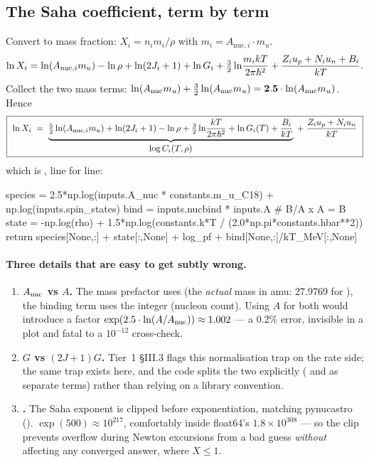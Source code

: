 \subsection{The Saha coefficient, term by term}
\label{sec:saha}

Convert to mass fraction: $X_i = n_i m_i/\rho$ with
$m_i = A_{\mathrm{nuc},i}\cdot m_u$.
%
\begin{equation}
\ln X_i = \ln(A_{\mathrm{nuc},i} m_u) - \ln\rho + \ln(2J_i+1) + \ln G_i
+ \tfrac32\ln\!\frac{m_i kT}{2\pi\hbar^2} + \frac{Z_iu_{p} + N_iu_{n} + B_i}{kT}.
\label{eq:lnxi}
\end{equation}
%
Collect the two mass terms:
$\ln(A_{\rm nuc} m_u) + \tfrac32\ln(A_{\rm nuc} m_u) =
\mathbf{2.5}\cdot\ln(A_{\rm nuc} m_u)$. Hence
%
\begin{equation}
\boxed{\ \ln X_i \;=\;
\underbrace{\tfrac52\ln(A_{\mathrm{nuc},i}m_u) + \ln(2J_i+1) - \ln\rho
+ \tfrac32\ln\!\frac{kT}{2\pi\hbar^2} + \ln G_i(T) + \frac{B_i}{kT}}
_{\textstyle \log C_i(T,\rho)}
\; + \; \frac{Z_iu_{p} + N_iu_{n}}{kT}\ }
\label{eq:sahacoeff}
\end{equation}
%
which is , line for line:

\begin{srclisting}
species = 2.5*np.log(inputs.A_nuc * constants.m_u_C18) + np.log(inputs.spin_states)
bind    = inputs.nucbind * inputs.A                     # B/A x A = B
state   = -np.log(rho) + 1.5*np.log(constants.k*T / (2.0*np.pi*constants.hbar**2))
return species[None,:] + state[:,None] + log_pf + bind[None,:]/kT_MeV[:,None]
\end{srclisting}

\paragraph{Three details that are easy to get subtly wrong.}

\begin{enumerate}
\item \textbf{$A_{\rm nuc}$ vs $A$.} The mass prefactor uses  (the
  \emph{actual} mass in amu: 27.9769 for ), the binding term uses
  the integer  (nucleon count). Using $A$ for both would introduce a
  factor $\exp(2.5\cdot\ln(A/A_{\rm nuc})) \approx 1.002$ --- a 0.2\% error,
  invisible in a plot and fatal to a $10^{-12}$ cross-check.
\item \textbf{$G$ vs $(2J{+}1)G$.} Tier~1 \S III.3 flags this normalisation trap
  on the rate side; the same trap exists here, and the code splits the two
  explicitly ( and  as separate terms) rather
  than relying on a library convention.
\item \textbf{.} The Saha exponent is clipped before
  exponentiation, matching pynucastro ().
  $\exp(500) \approx 10^{217}$, comfortably inside float64's
  $1.8\times10^{308}$ --- so the clip prevents overflow during Newton excursions
  from a bad guess \emph{without} affecting any converged answer, where
  $X \le 1$.
\end{enumerate}

